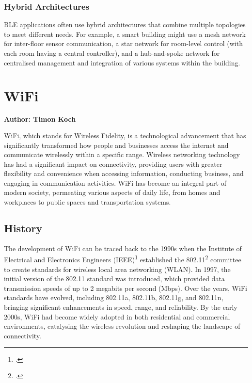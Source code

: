 \subsubsection{Hybrid Architectures}
BLE applications often use hybrid architectures that combine multiple topologies to meet different needs. For example, a smart building might use a mesh network for inter-floor sensor communication, a star network for room-level control (with each room having a central controller), and a hub-and-spoke network for centralised management and integration of various systems within the building.

\section{WiFi}
\textbf{Author: Timon Koch}

WiFi, which stands for Wireless Fidelity, is a technological advancement that has significantly transformed how people and businesses access the internet and communicate wirelessly within a specific range. Wireless networking technology has had a significant impact on connectivity, providing users with greater flexibility and convenience when accessing information, conducting business, and engaging in communication activities. WiFi has become an integral part of modern society, permeating various aspects of daily life, from homes and workplaces to public spaces and transportation systems.

\subsection{History}
The development of WiFi can be traced back to the 1990s when the Institute of Electrical and Electronics Engineers (IEEE)\footcite{ieee} established the 802.11\footcite{ieee_802_11} committee to create standards for wireless local area networking (WLAN). In 1997, the initial version of the 802.11 standard was introduced, which provided data transmission speeds of up to 2 megabits per second (Mbps). Over the years, WiFi standards have evolved, including 802.11a, 802.11b, 802.11g, and 802.11n, bringing significant enhancements in speed, range, and reliability. By the early 2000s, WiFi had become widely adopted in both residential and commercial environments, catalysing the wireless revolution and reshaping the landscape of connectivity.

